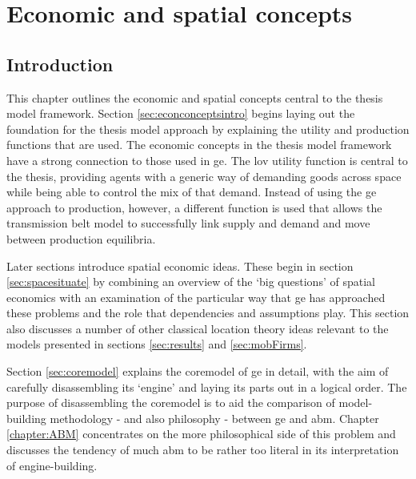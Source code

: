 \chapter{Economic and spatial concepts \label{chapter:location}}

\section{Introduction \label{sec:econsintro}}

This chapter outlines the economic and spatial concepts central to the thesis model framework. Section \ref{sec:econconceptsintro} begins laying out the foundation for the thesis model approach by explaining the utility and production functions that are used. The economic concepts in the thesis model framework have a strong connection to those used in \gls{ge}. The \gls{lov} utility function is central to the thesis, providing agents with a generic way of demanding goods across space while being able to control the mix of that demand. Instead of using the \gls{ge} approach to production, however, a different function is used that allows the transmission belt model to successfully link supply and demand and move between production equilibria.

Later sections introduce spatial economic ideas. These begin in section \ref{sec:spacesituate} by combining an overview of the `big questions' of spatial economics with an examination of the particular way that \gls{ge} has approached these problems and the role that dependencies and assumptions play. This section also discusses a number of other classical location theory ideas relevant to the models presented in sections \ref{sec:results} and \ref{sec:mobFirms}.

Section \ref{sec:coremodel} explains the \gls{coremodel} of \gls{ge} in detail, with the aim of carefully disassembling its `engine' and laying its parts out in a logical order. The purpose of disassembling the \gls{coremodel} is to aid the comparison of model-building methodology - and also philosophy - between \gls{ge} and \gls{abm}. Chapter \ref{chapter:ABM} concentrates on the more philosophical side of this problem and discusses the tendency of much \gls{abm} to be rather too literal in its interpretation of engine-building. 


